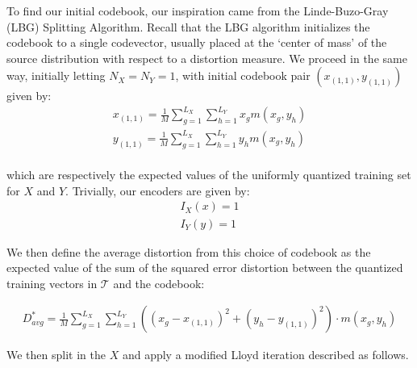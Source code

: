 \documentclass[10pt]{article}
\begin{document}
To find our initial codebook, our inspiration came from the Linde-Buzo-Gray (LBG) Splitting Algorithm. Recall that the LBG algorithm initializes the codebook to a single codevector, usually placed at the `center of mass' of the source distribution with respect to a distortion measure. We proceed in the same way, initially letting $N_X=N_Y=1$, with initial codebook pair $(x_{(1,1)},y_{(1,1)})$ given by: \\

\begin{align}
    x_{(1,1)} = \frac{1}{M}\sum_{g=1}^{L_X}\sum_{h=1}^{L_Y}x_g m(x_g, y_h)\\
    y_{(1,1)} = \frac{1}{M}\sum_{g=1}^{L_X}\sum_{h=1}^{L_Y}y_h m(x_g, y_h)
\end{align}
\\
which are respectively the expected values of the uniformly quantized training set for $X$ and $Y$. Trivially, our encoders are given by:\\

\begin{align}
    I_X(x) = 1\\
    I_Y(y) = 1
\end{align}

We then define the average distortion from this choice of codebook as the expected value of the sum of the squared error distortion between the quantized training vectors in $\mathcal T$ and the codebook:

\begin{align}
    D_{avg}^* = \frac{1}{M}\sum_{g=1}^{L_X}\sum_{h=1}^{L_Y}((x_g-x_{(1,1)})^2+(y_h-y_{(1,1)})^2)\cdot m(x_g,y_h)
\end{align}

We then split in the $X$ and apply a modified Lloyd iteration described as follows.\\
\end{document}

